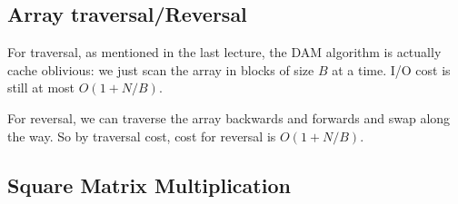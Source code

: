 \documentclass[11pt]{article}
\begin{document}
\subsection{Array traversal/Reversal}

For traversal, as mentioned in the last lecture, the DAM algorithm
 is actually cache oblivious: we just scan the array in
blocks of size $B$ at a time. I/O cost is still at most $O(1+N/B)$.

For reversal, we can traverse the array backwards and forwards and
swap along the way. So by traversal cost, cost for reversal is
$O(1+N/B)$.

\subsection{Square Matrix Multiplication}
\end{document}
